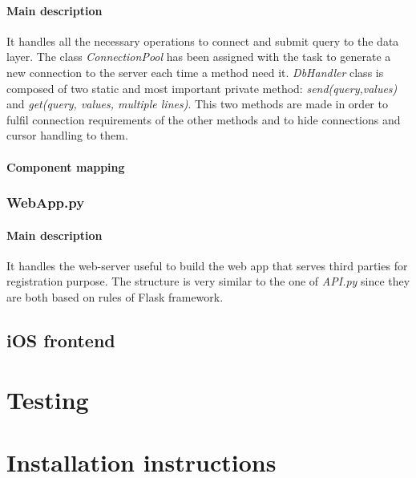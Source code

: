 \documentclass{article}
\begin{document}
 \paragraph{Main description}
 It handles all the necessary operations to connect and submit query to the data layer. The class \textit{ConnectionPool} has been assigned with the task to generate a new connection to the server each time a method need it. \textit{DbHandler} class is composed of two static and most important private method: \textit{send(query,values)} and \textit{get(query, values, multiple lines)}. This two methods are made in order to fulfil connection requirements of the other methods and to hide connections and cursor handling to them.
 \paragraph{Component  mapping}
 \subsubsection{WebApp.py}
 \paragraph{Main description}
 It handles the web-server useful to build the web app that serves third parties for registration purpose. The structure is very similar to the one of \textit{API.py} since they are both based on rules of Flask framework.
 \paragraph{}
 
\subsection{iOS frontend}

\section{Testing}

\section{Installation instructions}
\end{document}
